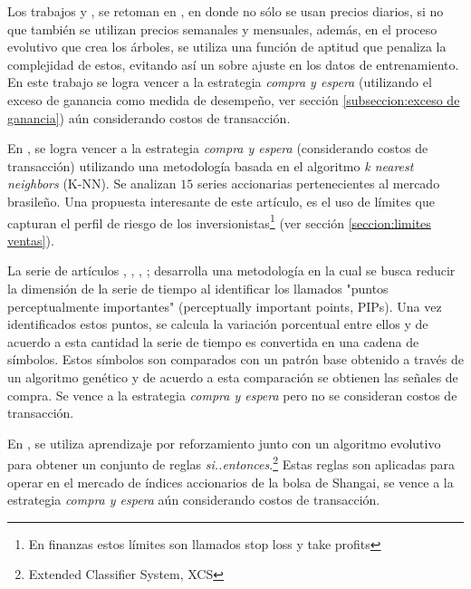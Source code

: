 \documentclass[12pt]{report}
\theoremstyle{break}
\theoremstyle{break}
\begin{document}
Los trabajos \cite{Allen1999} y \cite{Potvin2004}, se retoman en \cite{Lohpetch2010}, en donde no sólo se usan precios diarios, si no que también se utilizan precios semanales y mensuales, además, en el proceso evolutivo que crea los árboles, se utiliza una función de aptitud que penaliza la complejidad de estos, evitando así un sobre ajuste en los datos de entrenamiento. En este trabajo se logra vencer a la estrategia \textit{compra y espera} (utilizando el exceso de ganancia como medida de desempeño, ver sección \ref{subseccion:exceso de ganancia}) aún considerando costos de transacción.

En \cite{Teixeira2010}, se logra vencer a la estrategia \textit{compra y espera} (considerando costos de transacción) utilizando una metodología basada en el algoritmo \textit{k nearest neighbors} (K-NN). Se analizan $15$ series accionarias pertenecientes al mercado brasileño. Una propuesta interesante de este artículo, es el uso de límites que capturan el perfil de riesgo de los inversionistas\footnote{En finanzas estos límites son llamados stop loss y take profits} (ver sección \ref{seccion:limites ventas}).

La serie de artículos \cite{Canelas2012-gecco}, \cite{Canelas2013-gecco}, \cite{Canelas2013-journal}, \cite{Leitao2016}; desarrolla una metodología en la cual se busca reducir la dimensión de la serie de tiempo al identificar los llamados "puntos perceptualmente importantes" (perceptually important points, PIPs). Una vez identificados estos puntos, se calcula la variación porcentual entre ellos y de acuerdo a esta cantidad la serie de tiempo es convertida en una cadena de símbolos. Estos símbolos son comparados con un patrón base obtenido a través de un algoritmo genético y de acuerdo a esta comparación se obtienen las señales de compra. Se vence a la estrategia \textit{compra y espera} pero no se consideran costos de transacción.

En \cite{Hu2015-XCS}, se utiliza aprendizaje por reforzamiento junto con un algoritmo evolutivo para obtener un conjunto de reglas \textit{si..entonces}.\footnote{Extended Classifier System, XCS} Estas reglas son aplicadas para operar en el mercado de índices accionarios de la bolsa de Shangai, se vence a la estrategia \textit{compra y espera} aún considerando costos de transacción.
\end{document}
